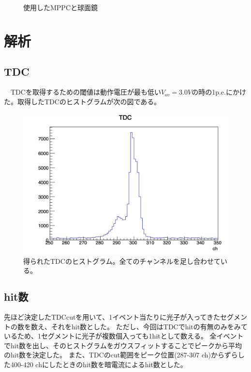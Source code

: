 \documentclass[uplatex, titlepage, dvipdfmx, 12pt, a4paper]{jsreport}
\begin{document}
\begin{figure}[htbp]
\begin{center}
\begin{tabular}{c}
    \end{tabular}
    \caption{使用したMPPCと球面鏡}
    \label{fig:MPPC'N'mirror}
  \end{center}
\end{figure}


\chapter{解析}
  \section{TDC}
  　TDCを取得するための閾値は動作電圧が最も低い$V_{ov}=3.0V$の時の1p.e.にかけた。取得したTDCのヒストグラムが次の図である。
  \begin{figure}[htbp]
    \begin{center} 
      \includegraphics[clip, scale=0.3]{image/tdc.png}
      \caption{得られたTDCのヒストグラム。全てのチャンネルを足し合わせている。}
      \label{fig:tdc} 
    \end{center}
  \end{figure}

  \section{hit数}
    先ほど決定したTDCcutを用いて、1イベント当たりに光子が入ってきたセグメントの数を数え、それをhit数とした。
    ただし、今回はTDCでhitの有無のみをみているため、1セグメントに光子が複数個入っても1hitとして数える。
    全イベントでhit数を出し、そのヒストグラムをガウスフィットすることでピークから平均のhit数を決定した。
    また、TDCのcut範囲をピーク位置(287-307 ch)からずらした400-420 chにしたときのhit数を暗電流によるhit数とした。
    
\end{document}
